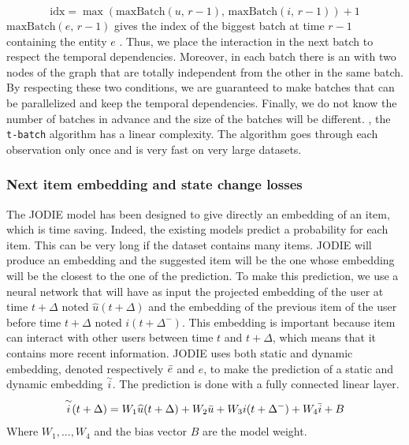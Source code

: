 $$
\text{idx} = \max \left ( \text{maxBatch}(u, \,r-1), \,\text{maxBatch}(i, \,r-1) \right ) + 1
$$
  $\text{maxBatch}(e, \,r-1)$ gives the index of the biggest batch at time $r-1$ containing the entity $e$ . Thus, we place the interaction in the next batch to respect the temporal dependencies. Moreover, in each batch there is an  with two nodes of the graph that are totally independent from the other  in the same batch. By respecting these two conditions, we are guaranteed to make batches that can be parallelized and keep the temporal dependencies. Finally, we do not know the number of batches in advance and the size of the batches will be different. , the \texttt{t-batch} algorithm has a linear complexity. The algorithm goes through each observation only once and is very fast on very large datasets.

\subsubsection{Next item embedding and state change losses}

The JODIE model has been designed to give directly an embedding of an item, which is time saving. Indeed, the existing models predict a probability for each item. This can be very long if the dataset contains many items. JODIE will produce an embedding and the suggested item will be the one whose embedding will be the closest to the one of the prediction. To make this prediction, we use a neural network that will have as input the projected embedding of the user at time $t+\Delta$ noted $\widehat u(t+\Delta)$ and the embedding of the previous item of the user before time $t+\Delta$ noted $i(t+\Delta^-)$. This embedding is important because item can interact with other users between time $t$ and $t+\Delta$, which means that it contains more recent information. JODIE uses both static and dynamic embedding, denoted respectively $\Bar{e}$ and $e$, to make the prediction of a static and dynamic embedding $\overset{\sim}{i}$. The prediction is done with a fully connected linear layer.
$$
\overset{\sim}{i} (t+\Delta) = W_1 \widehat u(t+\Delta) + W_2 \Bar{u} + W_3 i(t+\Delta^-) + W_4 \Bar{i} + B
$$
Where $W_1, ..., W_4$ and the bias vector $B$ are the model weight.\\

